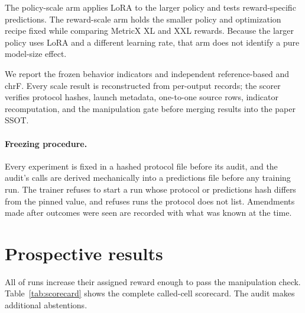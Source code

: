 \documentclass[11pt]{article}
\begin{document}
The policy-scale arm applies LoRA to the larger policy and tests reward-specific
predictions.  The reward-scale arm holds the smaller policy and optimization
recipe fixed while comparing MetricX XL and XXL rewards.  Because the larger
policy uses LoRA and a different learning rate, that arm does not identify a
pure model-size effect.

We report the frozen behavior indicators and independent reference-based
\ReferenceMetric{} and chrF.  Every scale result is reconstructed from per-output records;
the scorer verifies protocol hashes, launch metadata, one-to-one source rows,
indicator recomputation, and the manipulation gate before merging results into
the paper SSOT.

\paragraph{Freezing procedure.}
Every experiment is fixed in a hashed protocol file before its audit, and the
audit's calls are derived mechanically into a predictions file before any
training run.  The trainer refuses to start a run whose protocol or
predictions hash differs from the pinned value, and refuses runs the protocol
does not list.  Amendments made after outcomes were seen are recorded with what
was known at the time.

\section{Prospective results}

All \ScaleManipulationPasses{} of \ScaleRuns{} runs increase their assigned
reward enough to pass the manipulation check.  Table~\ref{tab:scorecard} shows
the complete called-cell scorecard.  The audit makes \ScaleAbstentions{}
additional abstentions.

\begin{table}[t]
\centering
\small
{}
\caption{Frozen prediction outcomes.  Each cell is a run by named failure type;
seeds do not create independent audit probabilities.}
\label{tab:scorecard}
\end{table}
\end{document}
